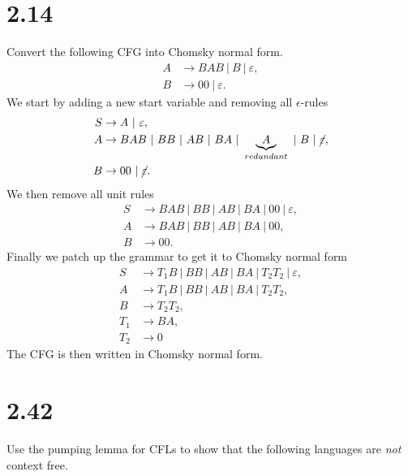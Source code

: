 \documentclass[a4paper,11pt]{article}
\numberwithin{equation}{section}
\begin{document}
	\section*{2.14}
	Convert the following CFG into Chomsky normal form.
	\begin{equation*}
	\begin{aligned}
	A&\to BAB \ \vert\ B \ \vert\ \varepsilon,\\
	B&\to 00\ \vert\ \varepsilon.
	\end{aligned}
	\end{equation*}
	We start by adding a new start variable and removing all $ \epsilon $-rules\begin{equation*}
	\begin{aligned}
	S&\to A\ \vert\ \varepsilon,\\
	A&\to BAB\ \vert\ BB \ \vert\ AB \ \vert\ BA \ \vert\ \underbrace{A}_{redundant} \ \vert\ B \ \vert\ \cancel{\varepsilon},\\
	B&\to 00 \ \vert\ \cancel{\varepsilon}.
	\end{aligned}
	\end{equation*}
	We then remove all unit rules 
	\begin{equation*}
	\begin{aligned}
	S&\to BAB\ \vert\ BB \ \vert\ AB \ \vert\ BA \ \vert\ 00\ \vert\ \varepsilon,\\
	A&\to BAB\ \vert\ BB \ \vert\ AB \ \vert\ BA \ \vert\ 00,\\
	B&\to 00.
	\end{aligned}
	\end{equation*}
	Finally we patch up the grammar to get it to Chomsky normal form
	\begin{equation*}
	\begin{aligned}
	S&\to T_1B\ \vert\ BB \ \vert\ AB \ \vert\ BA \ \vert\ T_2T_2\ \vert\ \varepsilon,\\
	A&\to T_1B \ \vert\ BB\ \vert \ AB \ \vert\ BA \ \vert\ T_2T_2,\\
	B&\to T_2T_2,\\
	T_1&\to BA,\\
	T_2&\to 0
	\end{aligned}
	\end{equation*}
	The CFG is then written in Chomsky normal form.	
	
	\section*{2.42}
	Use the pumping lemma for CFLs to show that the following languages are \emph{not} context free.
\end{document}
